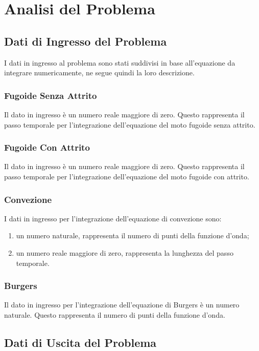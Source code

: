 \section{Analisi del Problema} 

\subsection{Dati di Ingresso del Problema}

I dati in ingresso al problema sono stati suddivisi in base all'equazione da integrare numericamente, ne segue quindi la loro descrizione.

\subsubsection*{Fugoide Senza Attrito}
Il dato in ingresso è un numero reale maggiore di zero.
Questo rappresenta il passo temporale per l'integrazione dell'equazione del moto fugoide senza attrito.
\subsubsection*{Fugoide Con Attrito}
Il dato in ingresso è un numero reale maggiore di zero. Questo rappresenta il passo temporale per l'integrazione dell'equazione del moto fugoide con attrito.
\subsubsection*{Convezione}
    I dati in ingresso per l'integrazione dell'equazione di convezione sono:
    \begin{enumerate}
        \item un numero naturale, rappresenta il numero di punti della funzione d'onda;
        \item un numero reale maggiore di zero, rappresenta la lunghezza del passo temporale.
    \end{enumerate}
\subsubsection*{Burgers}
Il dato in ingresso per l'integrazione dell'equazione di Burgers è un numero naturale. Questo rappresenta il numero di punti della funzione d'onda.

\subsection{Dati di Uscita del Problema}

